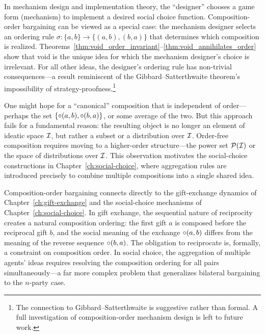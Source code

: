\begin{remark}
\label{rem:mechanism-design}
In mechanism design and implementation theory, the ``designer'' chooses
a game form (mechanism) to implement a desired social choice function.
Composition-order bargaining can be viewed as a special case: the
mechanism designer selects an ordering rule $\sigma: \{a,b\} \to
\{(a,b), (b,a)\}$ that determines which composition is realized.
Theorems~\ref{thm:void_order_invariant}--\ref{thm:void_annihilates_order}
show that void is the unique idea for which the mechanism designer's
choice is irrelevant.  For all other ideas, the designer's ordering
rule has non-trivial consequences---a result reminiscent of the
Gibbard--Satterthwaite theorem's impossibility of
strategy-proofness.\footnote{The connection to Gibbard--Satterthwaite
is suggestive rather than formal.  A full investigation of
composition-order mechanism design is left to future work.}
\end{remark}

\begin{remark}
\label{rem:order-free-impossibility}
One might hope for a ``canonical'' composition that is independent of
order---perhaps the set $\{\circ(a,b), \circ(b,a)\}$, or some
average of the two.  But this approach fails for a fundamental reason:
the resulting object is no longer an element of ideatic space $\mathcal{I}$, but
rather a subset or a distribution over $\mathcal{I}$.  Order-free composition
requires moving to a higher-order structure---the power set $\mathcal{P}(\mathcal{I})$
or the space of distributions over $\mathcal{I}$.  This observation motivates the
social-choice constructions in Chapter~\ref{ch:social-choice}, where
aggregation rules are introduced precisely to combine multiple compositions
into a single shared idea.
\end{remark}

\begin{remark}
\label{rem:cross-chapter}
Composition-order bargaining connects directly to the gift-exchange
dynamics of Chapter~\ref{ch:gift-exchange} and the social-choice
mechanisms of Chapter~\ref{ch:social-choice}.  In gift exchange, the
sequential nature of reciprocity creates a natural composition ordering:
the first gift $a$ is composed before the reciprocal gift $b$, and the
social meaning of the exchange $\circ(a, b)$ differs from the meaning
of the reverse sequence $\circ(b, a)$.  The obligation to reciprocate
is, formally, a constraint on composition order.  In social choice, the
aggregation of multiple agents' ideas requires resolving the composition
ordering for all pairs simultaneously---a far more complex problem that
generalizes bilateral bargaining to the $n$-party case.
\end{remark}

